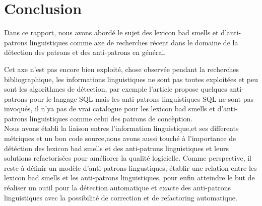 \section{Conclusion}
\tab Dans ce rapport, nous avons abordé le sujet des lexicon bad smells et d'anti-patrons linguistiques comme axe de recherches récent dans le domaine de la détection des patrons et des anti-patrons en général. \\ \tab

Cet axe n’est pas encore bien exploité, chose observée pendant la recherches bibliographique, les informations linguistiques ne sont pas toutes exploitées et  peu sont les algorithmes de détection, par exemple l'article \cite{karwin2010sql} propose quelques anti-patrons pour le langage SQL mais les anti-patrons linguistiques SQL ne sont pas invoqués, il n'ya pas de vrai catalogue pour les lexicon bad smells et d'anti-patrons linguistiques comme celui des patrons de concèption.
\\


\tab Nous avons établi la liaison entres l’information linguistique,et ses differents métriques et un bon code source,nous avons aussi touché à l’importance de détéction des lexicon bad smells et des anti-patrons linguistiques et leurs solutions refactorisées pour améliorer la qualité logicielle. Comme perspective, il  reste à définir un modèle d'anti-patrons lingustiques, établir une relation entre les lexicon bad smells et les anti-patrons linguistiques, pour enfin atteindre le but de réaliser un outil pour la détection automatique et exacte des anti-patrons linguistiques avec la possibilité de correction et de refactoring automatique.
